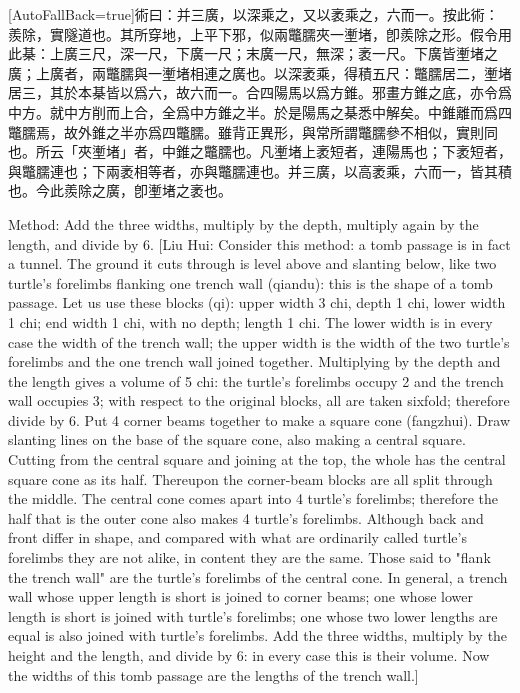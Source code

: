 \documentclass[11pt]{article}
\newcommand{\zhsmall}{\footnotesize\color{black!70}}
\newcommand{\unitlabel}[1]{\marginpar{\raggedleft\tiny\color{gray}#1}}
\newenvironment{unitzh}{\par\CJKfontspec{Noto Serif CJK SC}[AutoFallBack=true]\large\linespread{1.25}\selectfont}{\par}
\newenvironment{uniten}{\par\small\color{black!85}}{\par\medskip}
\begin{document}
\begin{unitzh}\unitlabel{jiuzhang-020.4}術曰：并三廣，以深乘之，又以袤乘之，六而一。{\zhsmall 按此術：羨除，實隧道也。其所穿地，上平下邪，似兩鼈臑夾一壍堵，卽羨除之形。假令用此棊：上廣三尺，深一尺，下廣一尺；末廣一尺，無深；袤一尺。下廣皆壍堵之廣；上廣者，兩鼈臑與一壍堵相連之廣也。以深袤乘，得積五尺：鼈臑居二，壍堵居三，其於本棊皆以爲六，故六而一。合四陽馬以爲方錐。邪畫方錐之底，亦令爲中方。就中方削而上合，全爲中方錐之半。於是陽馬之棊悉中解矣。中錐離而爲四鼈臑焉，故外錐之半亦爲四鼈臑。雖背正異形，與常所謂鼈臑參不相似，實則同也。所云「夾壍堵」者，中錐之鼈臑也。凡壍堵上袤短者，連陽馬也；下袤短者，與鼈臑連也；下兩袤相等者，亦與鼈臑連也。并三廣，以高袤乘，六而一，皆其積也。今此羨除之廣，卽壍堵之袤也。}\end{unitzh}
\begin{uniten}Method: Add the three widths, multiply by the depth, multiply again by the length, and divide by 6. [Liu Hui: Consider this method: a tomb passage is in fact a tunnel. The ground it cuts through is level above and slanting below, like two turtle's forelimbs flanking one trench wall (qiandu): this is the shape of a tomb passage. Let us use these blocks (qi): upper width 3 chi, depth 1 chi, lower width 1 chi; end width 1 chi, with no depth; length 1 chi. The lower width is in every case the width of the trench wall; the upper width is the width of the two turtle's forelimbs and the one trench wall joined together. Multiplying by the depth and the length gives a volume of 5 chi: the turtle's forelimbs occupy 2 and the trench wall occupies 3; with respect to the original blocks, all are taken sixfold; therefore divide by 6. Put 4 corner beams together to make a square cone (fangzhui). Draw slanting lines on the base of the square cone, also making a central square. Cutting from the central square and joining at the top, the whole has the central square cone as its half. Thereupon the corner-beam blocks are all split through the middle. The central cone comes apart into 4 turtle's forelimbs; therefore the half that is the outer cone also makes 4 turtle's forelimbs. Although back and front differ in shape, and compared with what are ordinarily called turtle's forelimbs they are not alike, in content they are the same. Those said to "flank the trench wall" are the turtle's forelimbs of the central cone. In general, a trench wall whose upper length is short is joined to corner beams; one whose lower length is short is joined with turtle's forelimbs; one whose two lower lengths are equal is also joined with turtle's forelimbs. Add the three widths, multiply by the height and the length, and divide by 6: in every case this is their volume. Now the widths of this tomb passage are the lengths of the trench wall.]\end{uniten}
\end{document}
